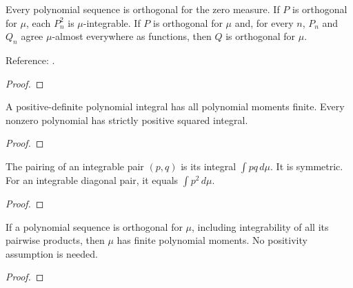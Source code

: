 \begin{supporting}

\begin{theorem}
\label{thm:orthogonal-sequence-basic}
\leanok
Every polynomial sequence is orthogonal for the zero measure. If $P$ is
orthogonal for $\mu$, each $P_n^2$ is $\mu$-integrable. If $P$ is orthogonal for
$\mu$ and, for every $n$, $P_n$ and $Q_n$ agree $\mu$-almost everywhere as
functions, then $Q$ is orthogonal for $\mu$.

Reference: \cite[18.2(i)]{dlmf}.
\end{theorem}
\begin{proof}
\leanok
\end{proof}

\begin{theorem}
\label{thm:polynomial-positive-characterisation}
\leanok
A positive-definite polynomial integral has all polynomial moments finite.
Every nonzero polynomial has strictly positive squared integral.
\end{theorem}
\begin{proof}
\leanok
\end{proof}

\begin{theorem}
\label{thm:polynomial-integrable-pair}
\leanok
The pairing of an integrable pair $(p,q)$ is its integral $\int pq\,d\mu$.
It is symmetric. For an integrable diagonal pair, it equals $\int p^2\,d\mu$.
\end{theorem}
\begin{proof}
\leanok
\end{proof}

\begin{theorem}
\label{thm:orthogonal-moments}
\leanok
If a polynomial sequence is orthogonal for $\mu$, including integrability of
all its pairwise products, then $\mu$ has finite polynomial moments.
No positivity assumption is needed.
\end{theorem}
\begin{proof}
\leanok
\end{proof}

\end{supporting}

